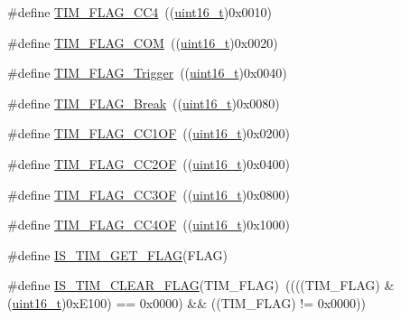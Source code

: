 \begin{DoxyCompactItemize}
\#define \hyperlink{group___t_i_m___flags_gafd0dc57b56941f8b8250d66e289542db}{T\+I\+M\+\_\+\+F\+L\+A\+G\+\_\+\+C\+C4}~((\hyperlink{_p_e___types_8h_a1f1825b69244eb3ad2c7165ddc99c956}{uint16\+\_\+t})0x0010)
\item 
\#define \hyperlink{group___t_i_m___flags_gad454d70205ce5bbf3b3c0e7e43d6df62}{T\+I\+M\+\_\+\+F\+L\+A\+G\+\_\+\+C\+OM}~((\hyperlink{_p_e___types_8h_a1f1825b69244eb3ad2c7165ddc99c956}{uint16\+\_\+t})0x0020)
\item 
\#define \hyperlink{group___t_i_m___flags_gaeca2f17eea738dbec7eee8ecbe442814}{T\+I\+M\+\_\+\+F\+L\+A\+G\+\_\+\+Trigger}~((\hyperlink{_p_e___types_8h_a1f1825b69244eb3ad2c7165ddc99c956}{uint16\+\_\+t})0x0040)
\item 
\#define \hyperlink{group___t_i_m___flags_ga166571a1d5ca2bfca5d923eaa22f6deb}{T\+I\+M\+\_\+\+F\+L\+A\+G\+\_\+\+Break}~((\hyperlink{_p_e___types_8h_a1f1825b69244eb3ad2c7165ddc99c956}{uint16\+\_\+t})0x0080)
\item 
\#define \hyperlink{group___t_i_m___flags_ga38dfb7d1ed00af77d70bc3be28500108}{T\+I\+M\+\_\+\+F\+L\+A\+G\+\_\+\+C\+C1\+OF}~((\hyperlink{_p_e___types_8h_a1f1825b69244eb3ad2c7165ddc99c956}{uint16\+\_\+t})0x0200)
\item 
\#define \hyperlink{group___t_i_m___flags_ga4df0c71d3e695c214d49802942e04590}{T\+I\+M\+\_\+\+F\+L\+A\+G\+\_\+\+C\+C2\+OF}~((\hyperlink{_p_e___types_8h_a1f1825b69244eb3ad2c7165ddc99c956}{uint16\+\_\+t})0x0400)
\item 
\#define \hyperlink{group___t_i_m___flags_gac81f24eaffdf83c2db9d2e6078a00919}{T\+I\+M\+\_\+\+F\+L\+A\+G\+\_\+\+C\+C3\+OF}~((\hyperlink{_p_e___types_8h_a1f1825b69244eb3ad2c7165ddc99c956}{uint16\+\_\+t})0x0800)
\item 
\#define \hyperlink{group___t_i_m___flags_gafc8b04654766d98ba2c6fed601895a20}{T\+I\+M\+\_\+\+F\+L\+A\+G\+\_\+\+C\+C4\+OF}~((\hyperlink{_p_e___types_8h_a1f1825b69244eb3ad2c7165ddc99c956}{uint16\+\_\+t})0x1000)
\item 
\#define \hyperlink{group___t_i_m___flags_ga6406de8131ae53ee29740c3e8627b098}{I\+S\+\_\+\+T\+I\+M\+\_\+\+G\+E\+T\+\_\+\+F\+L\+AG}(F\+L\+AG)
\item 
\#define \hyperlink{group___t_i_m___flags_gae60a1b5900de8354b2a4f017b2bd4f94}{I\+S\+\_\+\+T\+I\+M\+\_\+\+C\+L\+E\+A\+R\+\_\+\+F\+L\+AG}(T\+I\+M\+\_\+\+F\+L\+AG)~((((T\+I\+M\+\_\+\+F\+L\+AG) \& (\hyperlink{_p_e___types_8h_a1f1825b69244eb3ad2c7165ddc99c956}{uint16\+\_\+t})0x\+E100) == 0x0000) \&\& ((\+T\+I\+M\+\_\+\+F\+L\+A\+G) != 0x0000))
\end{DoxyCompactItemize}


